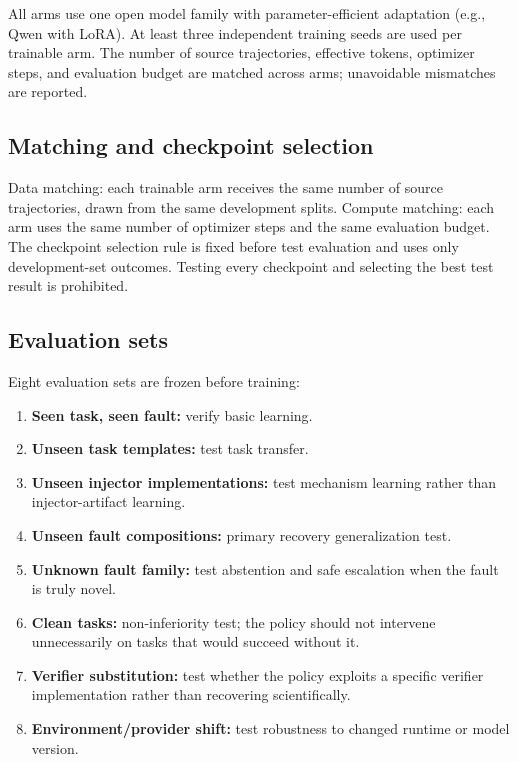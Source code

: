 All arms use one open model family with parameter-efficient adaptation
(e.g., Qwen with LoRA). At least three independent training seeds are used
per trainable arm. The number of source trajectories, effective tokens,
optimizer steps, and evaluation budget are matched across arms; unavoidable
mismatches are reported.

\subsection{Matching and checkpoint selection}

Data matching: each trainable arm receives the same number of source
trajectories, drawn from the same development splits. Compute matching:
each arm uses the same number of optimizer steps and the same evaluation
budget. The checkpoint selection rule is fixed before test evaluation
and uses only development-set outcomes. Testing every checkpoint and
selecting the best test result is prohibited.

\subsection{Evaluation sets}

Eight evaluation sets are frozen before training:

\begin{enumerate}
    \item \textbf{Seen task, seen fault:} verify basic learning.
    \item \textbf{Unseen task templates:} test task transfer.
    \item \textbf{Unseen injector implementations:} test mechanism learning
          rather than injector-artifact learning.
    \item \textbf{Unseen fault compositions:} primary recovery
          generalization test.
    \item \textbf{Unknown fault family:} test abstention and safe
          escalation when the fault is truly novel.
    \item \textbf{Clean tasks:} non-inferiority test; the policy should not
          intervene unnecessarily on tasks that would succeed without it.
    \item \textbf{Verifier substitution:} test whether the policy exploits
          a specific verifier implementation rather than recovering
          scientifically.
    \item \textbf{Environment/provider shift:} test robustness to changed
          runtime or model version.
\end{enumerate}

